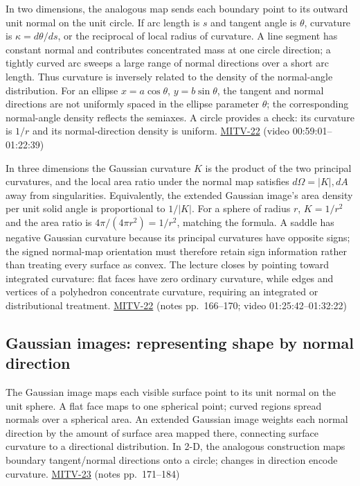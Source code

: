 In two dimensions, the analogous map sends each boundary point to its outward unit normal on the unit circle. If arc length is \(s\) and tangent angle is \(\theta\), curvature is \(\kappa=d\theta/ds\), or the reciprocal of local radius of curvature. A line segment has constant normal and contributes concentrated mass at one circle direction; a tightly curved arc sweeps a large range of normal directions over a short arc length. Thus curvature is inversely related to the density of the normal-angle distribution. For an ellipse \(x=a\cos\theta\), \(y=b\sin\theta\), the tangent and normal directions are not uniformly spaced in the ellipse parameter \(\theta\); the corresponding normal-angle density reflects the semiaxes. A circle provides a check: its curvature is \(1/r\) and its normal-direction density is uniform. \hyperref[04-visual-computing-ii-ch036-mitv-22---exterior-orientation-recovering-position-orientation-bundle-adjustment-object-shape]{MITV-22} (video 00:59:01--01:22:39)

In three dimensions the Gaussian curvature \(K\) is the product of the two principal curvatures, and the local area ratio under the normal map satisfies \(d\Omega=|K|,dA\) away from singularities. Equivalently, the extended Gaussian image's area density per unit solid angle is proportional to \(1/|K|\). For a sphere of radius \(r\), \(K=1/r^2\) and the area ratio is \(4\pi/(4\pi r^2)=1/r^2\), matching the formula. A saddle has negative Gaussian curvature because its principal curvatures have opposite signs; the signed normal-map orientation must therefore retain sign information rather than treating every surface as convex. The lecture closes by pointing toward integrated curvature: flat faces have zero ordinary curvature, while edges and vertices of a polyhedron concentrate curvature, requiring an integrated or distributional treatment. \hyperref[04-visual-computing-ii-ch036-mitv-22---exterior-orientation-recovering-position-orientation-bundle-adjustment-object-shape]{MITV-22} (notes pp.~166--170; video 01:25:42--01:32:22)

\subsection{Gaussian images: representing shape by normal direction}\label{04-visual-computing-ii-ch032-gaussian-images-representing-shape-by-normal-direction}

The Gaussian image maps each visible surface point to its unit normal on the unit sphere. A flat face maps to one spherical point; curved regions spread normals over a spherical area. An extended Gaussian image weights each normal direction by the amount of surface area mapped there, connecting surface curvature to a directional distribution. In 2-D, the analogous construction maps boundary tangent/normal directions onto a circle; changes in direction encode curvature. \hyperref[04-visual-computing-ii-ch036-mitv-23---gaussian-image-solids-of-revolution-direction-histograms-regular-polyhedra]{MITV-23} (notes pp.~171--184)


